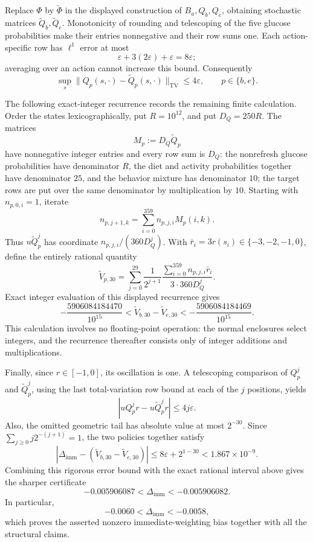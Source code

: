 Replace \(\Phi\) by \(\widetilde\Phi\) in the displayed construction
of \(B_a,Q_b,Q_e\), obtaining stochastic matrices
\(\widetilde Q_b,\widetilde Q_e\).  Monotonicity of rounding and
telescoping of the five glucose probabilities make their entries
nonnegative and their row sums one.  Each action-specific row has
\(\ell^1\) error at most
\[
 \varepsilon+3(2\varepsilon)+\varepsilon=8\varepsilon;
\]
averaging over an action cannot increase this bound.  Consequently
\[
 \sup_s\|Q_p(s,\cdot)-\widetilde Q_p(s,\cdot)\|_{\mathrm{TV}}
 \le4\varepsilon,\qquad p\in\{b,e\}.
\]

The following exact-integer recurrence records the remaining finite
calculation.  Order the states lexicographically, put
\(R=10^{12}\), and put \(D_Q=250R\).  The matrices
\[
 M_p:=D_Q\widetilde Q_p
\]
have nonnegative integer entries and every row sum is \(D_Q\): the
nonrefresh glucose probabilities have denominator \(R\), the diet and
activity probabilities together have denominator \(25\), and the
behavior mixture has denominator \(10\); the target rows are put over
the same denominator by multiplication by \(10\).  Starting with
\(n_{p,0,i}=1\), iterate
\[
 n_{p,j+1,k}=\sum_{i=0}^{359}n_{p,j,i}M_p(i,k).
\]
Thus \(u\widetilde Q_p^j\) has coordinate
\(n_{p,j,i}/(360D_Q^j)\).  With \(\bar r_i=3r(s_i)\in\{-3,-2,-1,0\}\),
define the entirely rational quantity
\[
 \widetilde V_{p,30}
 =\sum_{j=0}^{29}\frac1{2^{j+1}}
   \frac{\sum_{i=0}^{359}n_{p,j,i}\bar r_i}{3\cdot360D_Q^j}.
\]
Exact integer evaluation of this displayed recurrence gives
\[
 -\frac{5906084184470}{10^{15}}
 <\widetilde V_{b,30}-\widetilde V_{e,30}
 <-\frac{5906084184469}{10^{15}}.
\]
This calculation involves no floating-point operation: the normal
enclosures select integers, and the recurrence thereafter consists
only of integer additions and multiplications.

Finally, since \(r\in[-1,0]\), its oscillation is one.  A telescoping
comparison of \(Q_p^j\) and \(\widetilde Q_p^j\), using the last
total-variation row bound at each of the \(j\) positions, yields
\[
 |uQ_p^jr-u\widetilde Q_p^jr|\le4j\varepsilon.
\]
Also, the omitted geometric tail has absolute value at most
\(2^{-30}\).  Since \(\sum_{j\ge0}j2^{-(j+1)}=1\), the two policies
together satisfy
\[
 \left|\Delta_{\mathrm{imm}}-
   (\widetilde V_{b,30}-\widetilde V_{e,30})\right|
 \le8\varepsilon+2^{1-30}<1.867\times10^{-9}.
\]
Combining this rigorous error bound with the exact rational interval
above gives the sharper certificate
\[
 -0.005906087<\Delta_{\mathrm{imm}}<-0.005906082.
\]
In particular,
\[
 -0.0060<\Delta_{\mathrm{imm}}<-0.0058,
\]
which proves the asserted nonzero immediate-weighting bias together
with all the structural claims.
